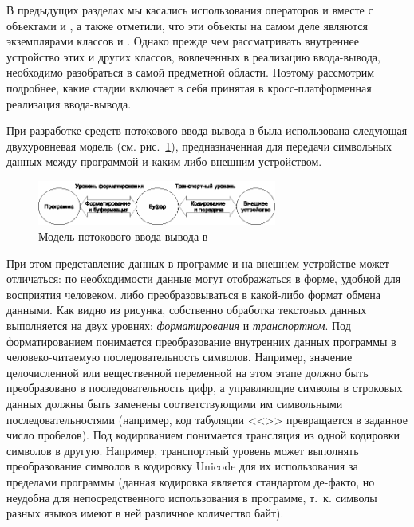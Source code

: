 В предыдущих разделах мы касались использования операторов \Sys{{<}{<}} и
\Sys{{>}{>}} вместе с объектами   и
, а также отметили, что эти объекты на самом деле являются экземплярами классов
 и . Однако прежде чем рассматривать внутреннее устройство
этих и других классов, вовлеченных в реализацию ввода-вывода, необходимо разобраться в самой предметной области.
Поэтому рассмотрим подробнее, какие стадии включает в себя принятая в  кросс-платформенная реализация ввода-вывода. 

При разработке средств потокового ввода-вывода в  была использована следующая двухуровневая модель 
(см. рис.~\ref{ch10:refDrawing2}), предназначенная для передачи символьных данных между программой и каким-либо внешним
устройством. 

\begin{figure}[htb]
\begin{center}
\includegraphics[width=0.7\textwidth]{img/ris_10_3}
\caption{Модель потокового ввода-вывода в }
\label{ch10:refDrawing2}
\end{center}
\end{figure}

При этом представление данных в программе и на внешнем устройстве может  отличаться: по необходимости данные могут
отображаться в форме, удобной для восприятия человеком, либо преобразовываться в какой-либо формат обмена данными. Как
видно из рисунка, собственно обработка текстовых данных выполняется на двух уровнях:
\emph{форматирования} и \emph{транспортном}. Под форматированием понимается
преобразование внутренних данных программы в человеко-читаемую последовательность символов. Например, значение
целочисленной или вещественной переменной на этом этапе должно быть преобразовано в последовательность цифр, а
управляющие символы в строковых данных должны быть заменены соответствующими им символьными последовательностями
(например, код табуляции <<>> превращается в заданное число пробелов). Под
кодированием понимается трансляция из одной кодировки символов в другую. Например, транспортный уровень может выполнять
преобразование символов в кодировку Unicode для их использования за пределами программы (данная кодировка является
стандартом де-факто, но неудобна для непосредственного использования в программе,  т.~к. символы разных языков имеют в
ней различное количество байт).

